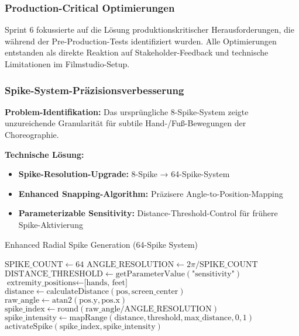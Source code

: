 \subsubsection{Production-Critical Optimierungen}

Sprint 6 fokussierte auf die Lösung produktionskritischer Herausforderungen, die während der Pre-Production-Tests identifiziert wurden. Alle Optimierungen entstanden als direkte Reaktion auf Stakeholder-Feedback und technische Limitationen im Filmstudio-Setup.

\subsubsection{Spike-System-Präzisionsverbesserung}

\textbf{Problem-Identifikation:}
Das ursprüngliche 8-Spike-System zeigte unzureichende Granularität für subtile Hand-/Fuß-Bewegungen der Choreographie.

\textbf{Technische Lösung:}
\begin{itemize}
    \item \textbf{Spike-Resolution-Upgrade:} 8-Spike → 64-Spike-System
    \item \textbf{Enhanced Snapping-Algorithm:} Präzisere Angle-to-Position-Mapping
    \item \textbf{Parameterizable Sensitivity:} Distance-Threshold-Control für frühere Spike-Aktivierung
\end{itemize}

\begin{algorithm}[H]
\caption{Enhanced Radial Spike Generation (64-Spike System)}\label{alg:enhanced_spike}
\begin{algorithmic}[1]
    \State $\text{SPIKE\_COUNT} \leftarrow 64$
    \State $\text{ANGLE\_RESOLUTION} \leftarrow 2\pi / \text{SPIKE\_COUNT}$
    \State $\text{DISTANCE\_THRESHOLD} \leftarrow \text{getParameterValue}(\text{"sensitivity"})$
    \State $\text{extremity\_positions} \leftarrow \text{[hands, feet]}$
        \State $\text{distance} \leftarrow \text{calculateDistance}(\text{pos}, \text{screen\_center})$
            \State $\text{raw\_angle} \leftarrow \text{atan2}(\text{pos.y}, \text{pos.x})$
            \State $\text{spike\_index} \leftarrow \text{round}(\text{raw\_angle} / \text{ANGLE\_RESOLUTION})$
            \State $\text{spike\_intensity} \leftarrow \text{mapRange}(\text{distance}, \text{threshold}, \text{max\_distance}, 0, 1)$
            \State $\text{activateSpike}(\text{spike\_index}, \text{spike\_intensity})$
        \EndIf
    \EndFor
\end{algorithmic}
\end{algorithm}

